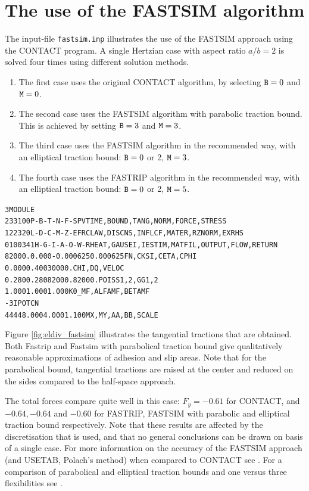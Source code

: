 \documentclass[12pt]{report}
\begin{document}
\section{The use of the FASTSIM algorithm}
\label{sec:ex_fastsim}

The input-file {\tt fastsim.inp} illustrates the use of the FASTSIM
approach using the CONTACT program. A single Hertzian case with aspect
ratio $a/b=2$ is solved four times using different solution methods.
\begin{enumerate}
\item The first case uses the original CONTACT algorithm, by selecting
        ${\tt B}=0$ and ${\tt M}=0$.
\item The second case uses the FASTSIM algorithm with parabolic traction
        bound. This is achieved by setting ${\tt B}=3$ and ${\tt M}=3$.
\item The third case uses the FASTSIM algorithm in the recommended way,
        with an elliptical traction bound: ${\tt B}=0$ or 2, ${\tt M}=3$.
\item The fourth case uses the FASTRIP algorithm in the recommended way,
        with an elliptical traction bound: ${\tt B}=0$ or 2, ${\tt M}=5$.
\end{enumerate}
\begin{alltt}\small

 3 MODULE
  233100     P-B-T-N-F-S        PVTIME, BOUND , TANG  , NORM , FORCE, STRESS
  122320     L-D-C-M-Z-E        FRCLAW, DISCNS, INFLCF, MATER, RZNORM, EXRHS
 0100341   H-G-I-A-O-W-R  HEAT, GAUSEI, IESTIM, MATFIL, OUTPUT, FLOW, RETURN
   82000.     0.000     -0.000625   0.000625        FN, CKSI, CETA, CPHI
   0.000      0.400      30000.                     CHI, DQ, VELOC
   0.280      0.280      82000.     82000.          POISS 1,2,  GG 1,2
   1.000      1.000      1.000                      K0_MF,ALFAMF,BETAMF
   -3                                               IPOTCN
   44   44     8.000      4.000      1.100          MX,MY,AA,BB,SCALE
\end{alltt}
Figure \ref{fig:eldiv_fastsim} illustrates the tangential tractions that
are obtained. Both Fastrip and Fastsim with parabolical traction bound give
qualitatively reasonable approximations of adhesion and slip areas. Note
that for the parabolical bound, tangential tractions are raised at the
center and reduced on the sides compared to the half-space approach. 

The total forces compare quite well in this case: $F_y=-0.61$ for CONTACT,
and $-0.64, -0.64$ and $-0.60$ for FASTRIP, FASTSIM with parabolic and
elliptical traction bound respectively. Note that these results are
affected by the discretisation that is used, and that no general
conclusions can be drawn on basis of a single case. For more
information on the accuracy of the FASTSIM approach (and USETAB, Polach's
method) when compared to CONTACT see \cite{Vollebregt2011a-assessm}. For
a comparison of parabolical and elliptical traction bounds and one versus
three flexibilities see \cite{Vollebregt2010b-fastsim2,Vollebregt2022a-1flex}.
\end{document}
